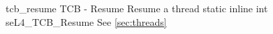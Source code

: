 %
%
%
%

\apidoc
{tcb_resume}
{TCB - Resume}
{Resume a thread}
{static inline int seL4\_TCB\_Resume}
{
}
{\errorenumdesc}
{See \autoref{sec:threads}}
